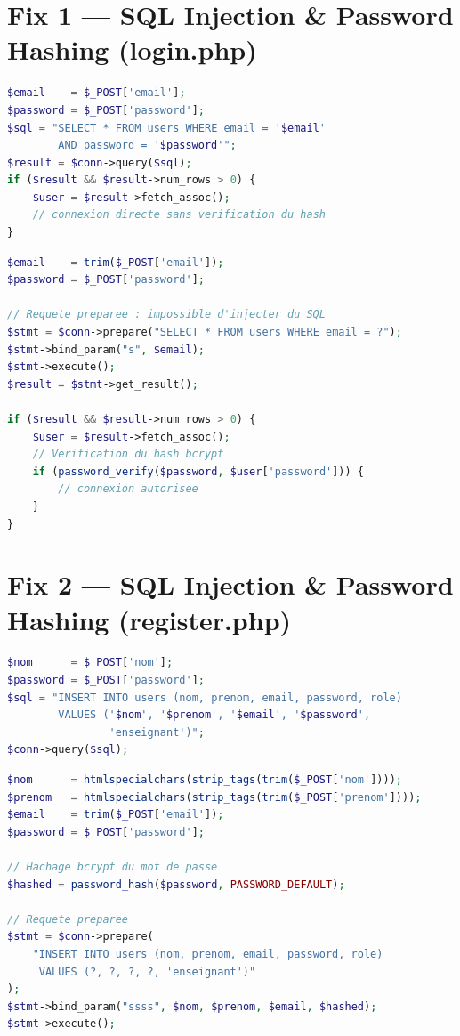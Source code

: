 ﻿\documentclass[12pt,a4paper]{report}
\begin{document}
\section{Fix 1 --- SQL Injection \& Password Hashing (login.php)}

\begin{lstlisting}[language=PHP, caption={Avant --- login.php vulnérable}]
$email    = $_POST['email'];
$password = $_POST['password'];
$sql = "SELECT * FROM users WHERE email = '$email'
        AND password = '$password'";
$result = $conn->query($sql);
if ($result && $result->num_rows > 0) {
    $user = $result->fetch_assoc();
    // connexion directe sans verification du hash
}
\end{lstlisting}

\begin{lstlisting}[language=PHP, caption={Après --- login.php sécurisé}]
$email    = trim($_POST['email']);
$password = $_POST['password'];

// Requete preparee : impossible d'injecter du SQL
$stmt = $conn->prepare("SELECT * FROM users WHERE email = ?");
$stmt->bind_param("s", $email);
$stmt->execute();
$result = $stmt->get_result();

if ($result && $result->num_rows > 0) {
    $user = $result->fetch_assoc();
    // Verification du hash bcrypt
    if (password_verify($password, $user['password'])) {
        // connexion autorisee
    }
}
\end{lstlisting}

\section{Fix 2 --- SQL Injection \& Password Hashing (register.php)}

\begin{lstlisting}[language=PHP, caption={Avant --- register.php vulnérable}]
$nom      = $_POST['nom'];
$password = $_POST['password'];
$sql = "INSERT INTO users (nom, prenom, email, password, role)
        VALUES ('$nom', '$prenom', '$email', '$password',
                'enseignant')";
$conn->query($sql);
\end{lstlisting}

\begin{lstlisting}[language=PHP, caption={Après --- register.php sécurisé}]
$nom      = htmlspecialchars(strip_tags(trim($_POST['nom'])));
$prenom   = htmlspecialchars(strip_tags(trim($_POST['prenom'])));
$email    = trim($_POST['email']);
$password = $_POST['password'];

// Hachage bcrypt du mot de passe
$hashed = password_hash($password, PASSWORD_DEFAULT);

// Requete preparee
$stmt = $conn->prepare(
    "INSERT INTO users (nom, prenom, email, password, role)
     VALUES (?, ?, ?, ?, 'enseignant')"
);
$stmt->bind_param("ssss", $nom, $prenom, $email, $hashed);
$stmt->execute();
\end{lstlisting}
\end{document}
